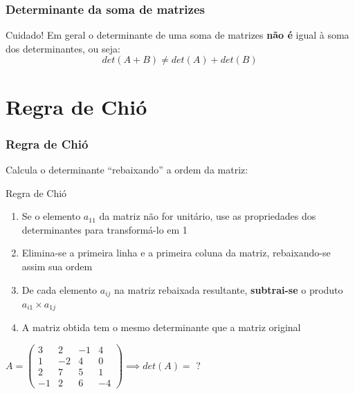 \documentclass[pdftex, brazil]{beamer}
\begin{document}
\begin{frame}[t]
  \frametitle{Determinante da soma de matrizes}
  \begin{alertblock}{Cuidado!}
    Em geral o determinante de uma soma de matrizes \textbf{não é} igual à soma
    dos determinantes, ou seja: $$det(A + B) \ne det(A) + det(B)$$
  \end{alertblock}


\end{frame}


\section{Regra de Chió}

\begin{frame}[t]
  \frametitle{Regra de Chió}
  Calcula o determinante ``rebaixando'' a ordem da matriz:
  \begin{block}{Regra de Chió}
    \begin{enumerate}
      \item Se o elemento $a_{11}$ da matriz não for unitário, use as
        propriedades dos determinantes para transformá-lo em 1
      \item Elimina-se a primeira linha e a primeira coluna da matriz,
        rebaixando-se assim sua ordem
      \item De cada elemento $a_{ij}$ na matriz rebaixada resultante,
        \textbf{subtrai-se} o produto $a_{i1} \times a_{1j}$
      \item A matriz obtida tem o mesmo determinante que a matriz original
    \end{enumerate}
  \end{block}
  $A = \begin{pmatrix}
    3 & 2 & -1 & 4\\
    1 & -2 & 4 & 0\\
    2 & 7 & 5 & 1\\
    -1 & 2 & 6 & -4\end{pmatrix} \implies det(A) = $ ?
\end{frame}
\end{document}
